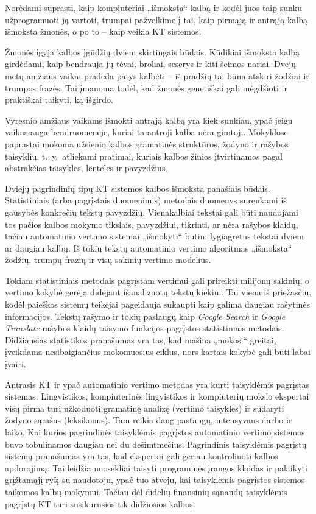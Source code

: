 \begin{multicols}{2}
Norėdami suprasti, kaip kompiuteriai „išmoksta“ kalbą ir kodėl juos taip sunku užprogramuoti ją vartoti, trumpai pažvelkime į tai, kaip pirmąją ir antrąją kalbą išmoksta žmonės, o po to – kaip veikia KT sistemos.

Žmonės įgyja kalbos įgūdžių dviem skirtingais būdais. Kūdikiai išmoksta kalbą girdėdami, kaip bendrauja jų tėvai, broliai, seserys ir kiti šeimos nariai. Dvejų metų amžiaus vaikai pradeda patys kalbėti – iš pradžių tai būna atskiri žodžiai ir trumpos frazės. Tai įmanoma  todėl, kad žmonės  genetiškai gali mėgdžioti ir praktiškai taikyti, ką išgirdo.

Vyresnio amžiaus vaikams išmokti antrąją kalbą yra kiek sunkiau, ypač jeigu vaikas auga bendruomenėje, kuriai ta antroji kalba nėra gimtoji. Mokyklose paprastai mokoma užsienio kalbos gramatinės struktūros, žodyno ir rašybos taisyklių, t.~y.~atliekami pratimai, kuriais kalbos žinios įtvirtinamos pagal abstrakčias taisykles, lenteles ir pavyzdžius. 

Dviejų pagrindinių tipų KT sistemos kalbos išmoksta panašiais būdais. Statistiniais (arba pagrįstais duomenimis) metodais duomenys surenkami iš gausybės konkrečių tekstų pavyzdžių. Vienakalbiai tekstai gali būti naudojami tos pačios kalbos mokymo tikslais, pavyzdžiui, tikrinti, ar nėra rašybos klaidų, tačiau automatinio vertimo sistemai „išmokyti“ būtini lygiagretūs tekstai dviem ar daugiau kalbų. Iš tokių tekstų automatinio vertimo algoritmas „išmoksta“ žodžių, trumpų frazių ir visų sakinių vertimo modelius. 


Tokiam statistiniais metodais pagrįstam vertimui gali prireikti milijonų sakinių, o vertimo kokybė gerėja didėjant išanalizuotų tekstų kiekiui. Tai viena iš priežasčių, kodėl paieškos sistemų teikėjai pageidauja sukaupti kaip galima daugiau rašytinės informacijos. Tekstų rašymo ir tokių paslaugų kaip \textit{Google Search} ir \textit{Google Translate} rašybos klaidų taisymo funkcijos pagrįstos statistiniais metodais. Didžiausias statistikos pranašumas yra tas, kad mašina „mokosi“ greitai, įveikdama nesibaigiančius mokomuosius ciklus, nors kartais kokybė gali būti labai įvairi.

Antrasis KT ir ypač automatinio vertimo metodas yra kurti taisyklėmis pagrįstas sistemas. Lingvistikos, kompiuterinės lingvistikos ir kompiuterių mokslo ekspertai visų pirma turi užkoduoti gramatinę analizę (vertimo taisykles) ir sudaryti žodyno sąrašus (leksikonus). Tam reikia daug pastangų, intensyvaus darbo ir laiko. Kai kurios pagrindinės taisyklėmis pagrįstos automatinio vertimo sistemos buvo tobulinamos daugiau nei du dešimtmečius. Pagrindinis taisyklėmis pagrįstų sistemų pranašumas yra tas, kad ekspertai gali geriau kontroliuoti kalbos apdorojimą. Tai leidžia nuosekliai taisyti programinės įrangos klaidas ir palaikyti grįžtamąjį ryšį su naudotoju, ypač tuo atveju, kai taisyklėmis pagrįstos sistemos taikomos kalbų mokymui. Tačiau dėl didelių finansinių sąnaudų taisyklėmis pagrįstų KT turi susikūrusios tik didžiosios kalbos. 


\end{multicols}
